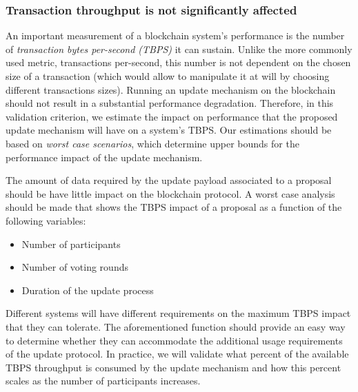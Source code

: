 \subsubsection{Transaction throughput is not significantly
	affected}\label{vc:Transaction_throughput_is_not_significantly_affected}
An important measurement of a blockchain system’s performance is the number of
\emph{transaction bytes per-second (TBPS)} it can sustain. Unlike the more
commonly used metric, transactions per-second, this number is not dependent on
the chosen size of a transaction (which would allow to manipulate it at will by
choosing different transactions sizes). Running an update mechanism on the
blockchain should not result in a substantial performance degradation.
Therefore, in this validation criterion, we estimate the impact on performance
that the proposed update mechanism will have on a system’s TBPS. Our
estimations should be based on \emph{worst case scenarios}, which
determine upper bounds for the performance impact of the update mechanism.

The amount of data required by the update payload associated to a proposal
should be have little impact on the blockchain protocol. 
A worst case
analysis should be made that shows the TBPS impact of a proposal
as a function of the following variables:
\begin{itemize}
	\item Number of participants
	\item Number of voting rounds
	\item Duration of the update process
\end{itemize}

Different systems will have different requirements on the maximum TBPS impact
that they can tolerate. The aforementioned function should provide an easy way
to determine whether they can accommodate the additional usage requirements of
the update protocol. In practice, we will validate what percent of the
available TBPS throughput is consumed by the update mechanism and how this
percent scales as the number of participants increases.

